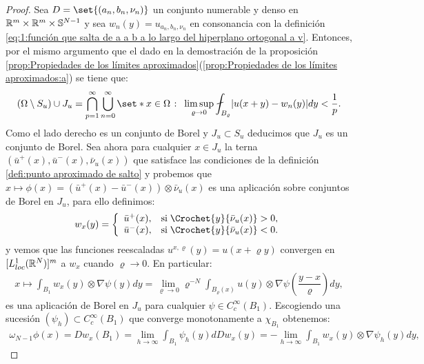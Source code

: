 \documentclass[a4paper,11pt,spanish, twoside, leqno]{tfm-uam}
\begin{document}
\begin{proof}
Sea $D=\set{(a_{n}, b_{n}, \nu_{n})}$ un conjunto numerable y denso en $\mathbb{R}^{m}\times\mathbb{R}^{m}\times \mathbb{S}^{N-1}$ y sea $w_{n}(y)=u_{a_{n},b_{n},\nu_{n}}$ en consonancia con la definición \ref{eq:1:función que salta de a a b a lo largo del hiperplano ortogonal a v}. Entonces, por el mismo argumento que el dado en la demostración de la proposición \ref{prop:Propiedades de los límites aproximados}(\ref{prop:Propiedades de los límites aproximados:a}) se tiene que:
\begin{align*}
(\Omega\setminus S_{u})\cup J_{u} =\bigcap_{p=1}^{\infty}\bigcup_{n=0}^{\infty}\set*{x\in \Omega\given \limsup_{\varrho\to 0} \fint_{B_{\varrho}}\abs*{u(x+y)-w_{n}(y)}dy<\dfrac{1}{p}}.
\end{align*}
Como el lado derecho es un conjunto de Borel y $J_{u}\subset S_{u}$ deducimos que $J_{u}$ es un conjunto de Borel. Sea ahora para cualquier $x\in J_{u}$ la terna $(\bar{u}^{+}(x), \bar{u}^{-}(x), \bar{\nu}_{u}(x))$ que satisface las condiciones de la definición \ref{defi:punto aproximado de salto} y probemos que $x\mapsto \phi(x)=\left ( \bar{u}^{+}(x) - \bar{u}^{-}(x) \right )\otimes \bar{\nu}_{u}(x)$ es una aplicación sobre conjuntos de Borel en $J_{u}$, para ello definimos:
\begin{align*}
w_{x}(y)= \left \{ \begin{array}{ll} 
\bar{u}^{+}(x),& \text{si}\; \Crochet{y}{\bar{\nu}_{u}(x)}>0,\\
\bar{u}^{-}(x),& \text{si}\; \Crochet{y}{\bar{\nu}_{u}(x)}<0.
\end{array}
\right.
\end{align*}
y vemos que las funciones reescaladas $u^{x,\varrho}(y)=u(x+\varrho y)$ convergen en $[ L^{1}_{loc}(\mathbb{R}^{N})]^{m}$ a $w_{x}$ cuando $\varrho \to 0$. En particular:
\begin{align*}
x\mapsto \int_{B_{1}}w_{x}(y)\otimes \nabla\psi(y) dy = \lim_{\varrho \to 0}\varrho^{-N}\int_{B_{\varrho}(x)}u(y)\otimes\nabla \psi\left (\dfrac{y-x}{\varrho} \right ) dy,
\end{align*}
es una aplicación de Borel en $J_{u}$ para cualquier $\psi\in C^{\infty}_{c}(B_{1})$. Escogiendo una sucesión $(\psi_{h})\subset C^{\infty}_{c}(B_{1})$ que converge monotonamente a $\chi_{B_{1}}$ obtenemos:
\begin{align*}
\omega_{N-1}\phi(x)=Dw_{x}(B_{1})=\lim_{h\to \infty}\int_{B_{1}}\psi_{h}(y)dDw_{x}(y)=-\lim_{h\to \infty}\int_{B_1}w_{x}(y)\otimes \nabla\psi_{h}(y) dy,
\end{align*}

\end{proof}
\end{document}
